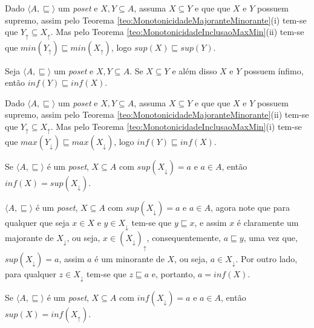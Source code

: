 \begin{prova}
	Dado $\langle A, \sqsubseteq \rangle$ um \textit{poset} e $X, Y \subseteq A$, assuma $X \subseteq Y$ e que que $X$ e $Y$ possuem supremo, assim pelo Teorema \ref{teo:MonotonicidadeMajoranteMinorante}(i) tem-se que $Y_\uparrow \subseteq X_\uparrow$.  Mas pelo Teorema \ref{teo:MonotonicidadeInclusaoMaxMin}(ii) tem-se que $min(Y_\uparrow) \sqsubseteq min(X_\uparrow)$, logo $sup(X) \sqsubseteq sup(Y)$.
\end{prova}

\begin{teorema}
	Seja $\langle A, \sqsubseteq \rangle$ um \textit{poset} e $X, Y \subseteq A$. Se $X \subseteq Y$ e além disso $X$ e $Y$ possuem ínfimo, então $inf(Y) \sqsubseteq inf(X)$.
\end{teorema}

\begin{prova}
	Dado $\langle A, \sqsubseteq \rangle$ um \textit{poset} e $X, Y \subseteq A$, assuma $X \subseteq Y$ e que que $X$ e $Y$ possuem supremo, assim pelo Teorema \ref{teo:MonotonicidadeMajoranteMinorante}(ii) tem-se que $Y_\uparrow \subseteq X_\uparrow$.  Mas pelo Teorema \ref{teo:MonotonicidadeInclusaoMaxMin}(i) tem-se que $max(Y_\downarrow) \sqsubseteq max(X_\downarrow)$, logo $inf(Y) \sqsubseteq inf(X)$.
\end{prova}

\begin{teorema}\label{teo:InfimoApartirSupremo}
	Se $\langle A, \sqsubseteq \rangle$ é um \textit{poset}, $X \subseteq A$ com $sup(X_\downarrow) = a$ e $a \in A$, então $inf(X) = sup(X_\downarrow) $.
\end{teorema}

\begin{prova}
	$\langle A, \sqsubseteq \rangle$ é um \textit{poset}, $X \subseteq A$ com $sup(X_\downarrow) = a$ e $a \in A$, agora note que para qualquer que seja $x \in X$ e $y \in X_\downarrow$ tem-se que $y \sqsubseteq x$, e assim $x$ é claramente um majorante de $X_\downarrow$, ou seja, $x \in (X_\downarrow)_\uparrow$,  consequentemente, $a \sqsubseteq y$, uma vez que, $sup(X_\downarrow) = a$, assim $a$ é um minorante de $X$, ou seja, $a \in X_\downarrow$. Por outro lado, para qualquer $z \in X_\downarrow$ tem-se que $z \sqsubseteq a$ e, portanto, $a = inf(X)$.
\end{prova}

\begin{teorema}\label{teo:SupremoApartirInfimo}
	Se $\langle A, \sqsubseteq \rangle$ é um \textit{poset}, $X \subseteq A$ com $inf(X_\downarrow) = a$ e $a \in A$, então $sup(X) = inf(X_\uparrow) $.
\end{teorema}

